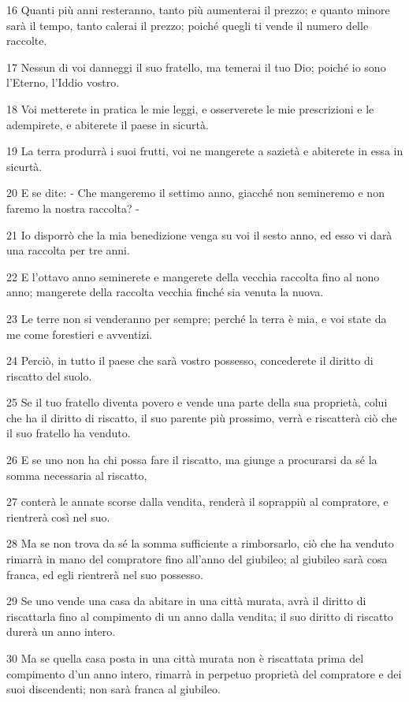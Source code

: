 \par 16 Quanti più anni resteranno, tanto più aumenterai il prezzo; e quanto minore sarà il tempo, tanto calerai il prezzo; poiché quegli ti vende il numero delle raccolte.
\par 17 Nessun di voi danneggi il suo fratello, ma temerai il tuo Dio; poiché io sono l'Eterno, l'Iddio vostro.
\par 18 Voi metterete in pratica le mie leggi, e osserverete le mie prescrizioni e le adempirete, e abiterete il paese in sicurtà.
\par 19 La terra produrrà i suoi frutti, voi ne mangerete a sazietà e abiterete in essa in sicurtà.
\par 20 E se dite: - Che mangeremo il settimo anno, giacché non semineremo e non faremo la nostra raccolta? -
\par 21 Io disporrò che la mia benedizione venga su voi il sesto anno, ed esso vi darà una raccolta per tre anni.
\par 22 E l'ottavo anno seminerete e mangerete della vecchia raccolta fino al nono anno; mangerete della raccolta vecchia finché sia venuta la nuova.
\par 23 Le terre non si venderanno per sempre; perché la terra è mia, e voi state da me come forestieri e avventizi.
\par 24 Perciò, in tutto il paese che sarà vostro possesso, concederete il diritto di riscatto del suolo.
\par 25 Se il tuo fratello diventa povero e vende una parte della sua proprietà, colui che ha il diritto di riscatto, il suo parente più prossimo, verrà e riscatterà ciò che il suo fratello ha venduto.
\par 26 E se uno non ha chi possa fare il riscatto, ma giunge a procurarsi da sé la somma necessaria al riscatto,
\par 27 conterà le annate scorse dalla vendita, renderà il soprappiù al compratore, e rientrerà così nel suo.
\par 28 Ma se non trova da sé la somma sufficiente a rimborsarlo, ciò che ha venduto rimarrà in mano del compratore fino all'anno del giubileo; al giubileo sarà cosa franca, ed egli rientrerà nel suo possesso.
\par 29 Se uno vende una casa da abitare in una città murata, avrà il diritto di riscattarla fino al compimento di un anno dalla vendita; il suo diritto di riscatto durerà un anno intero.
\par 30 Ma se quella casa posta in una città murata non è riscattata prima del compimento d'un anno intero, rimarrà in perpetuo proprietà del compratore e dei suoi discendenti; non sarà franca al giubileo.
